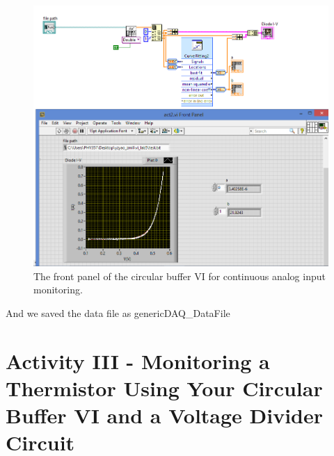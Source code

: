 \documentclass[11pt]{article}
\begin{document}
\begin{figure}[H]
 \begin{center}
  \includegraphics[width=\linewidth/2]{act2}
  \caption{The front panel of the circular buffer VI for continuous analog input monitoring.}
  \label{fig:act2}
 \end{center}
\end{figure}

And we saved the data file as genericDAQ_DataFile

\section{Activity III - Monitoring a Thermistor Using Your Circular Buffer VI and a Voltage Divider Circuit}
\end{document}
